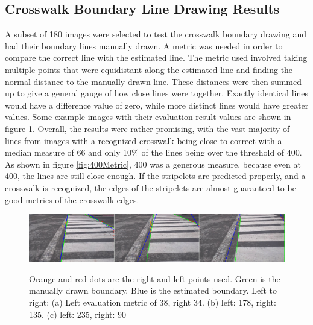 \documentclass[12pt]{ucthesis}
\newcommand{\captionfonts}{\small\bf\ssp}
\begin{document}
\subsection{Crosswalk Boundary Line Drawing Results}

A subset of 180 images were selected to test the crosswalk boundary drawing and had their boundary lines manually drawn. A metric was needed in order to compare the correct line with the estimated line. The metric used involved taking multiple points that were equidistant along the estimated line and finding the normal distance to the manually drawn line. These distances were then summed up to give a general gauge of how close lines were together. Exactly identical lines would have a difference value of zero, while more distinct lines would have greater values. Some example images with their evaluation result values are shown in figure \ref{fig:LinesUsingJustGoodStartAndEnds2}. Overall, the results were rather promising, with the vast majority of lines from images with a recognized crosswalk being close to correct with a median measure of 66 and only 10\% of the lines being over the threshold of 400. As shown in figure \ref{fig:400Metric}, 400 was a generous measure, because even at 400, the lines are still close enough.  If the stripelets are predicted properly, and a crosswalk is recognized, the edges of the stripelets are almost guaranteed to be good metrics of the crosswalk edges.

\begin{figure}[t]
\begin{center}
\includegraphics[width=15cm]{LinesUsingJustGoodStartAndEnds2.png}
\captionfonts
\caption[Boundary Line Estimation Results]{Orange and red dots are the right and left points used. Green is the manually drawn boundary. Blue is the estimated boundary. Left to right: (a) Left evaluation metric of 38, right 34. (b) left: 178, right: 135. (c) left: 235, right: 90}
\label{fig:LinesUsingJustGoodStartAndEnds2}
\end{center}
\end{figure}
\end{document}
